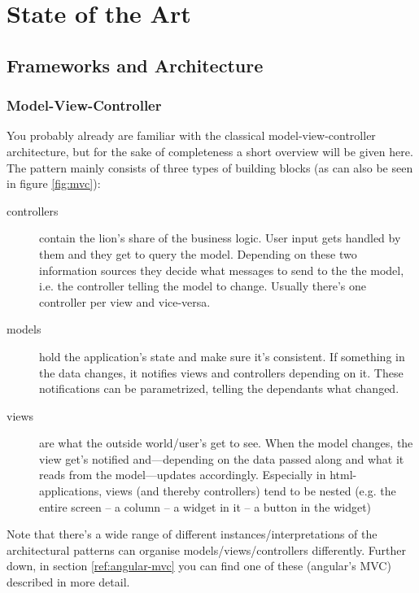 
\chapter{State of the Art}

\section{Frameworks and Architecture}

\subsection{Model-View-Controller}\label{ref:mvc}

You probably already are familiar with the classical model-view-controller architecture, but for the sake of completeness a short overview will be given here. The pattern mainly consists of three types of building blocks (as can also be seen in figure \ref{fig:mvc}): 

\begin{description}
  \item[controllers] contain the lion's share of the business logic. User input gets handled by them and they get to query the model. Depending on these two information sources they decide what messages to send to the the model, i.e. the controller telling the model to change. Usually there's one controller per view and vice-versa.
  \item[models] hold the application's state and make sure it's consistent. If something in the data changes, it notifies views and controllers depending on it. These notifications can be parametrized, telling the dependants what changed.
  \item[views] are what the outside world/user's get to see. When the model changes, the view get's notified and---depending on the data passed along and what it reads from the model---updates accordingly.
  Especially in html-applications, views (and thereby controllers) tend to be nested (e.g. the entire screen -- a column -- a widget in it -- a button in the widget)
\end{description}

Note that there's a wide range of different instances/interpretations of the architectural patterns can organise models/views/controllers differently. Further down, in section \ref{ref:angular-mvc} you can find one of these (angular's MVC) described in more detail.

